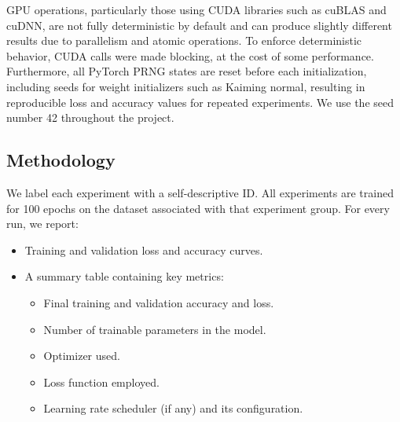 \documentclass[12pt]{article}
\begin{document}
		GPU operations, particularly those using CUDA libraries such as cuBLAS and cuDNN, are not fully deterministic by default and can produce slightly different results due to parallelism and atomic operations. To enforce deterministic behavior, CUDA calls were made blocking, at the cost of some performance. Furthermore, all PyTorch PRNG states are reset before each initialization, including seeds for weight initializers such as Kaiming normal, resulting in reproducible loss and accuracy values for repeated experiments. We use the seed number 42 throughout the project.
		
		\subsection{Methodology}
		We label each experiment with a self-descriptive ID. All experiments are trained for 100 epochs on the dataset associated with that experiment group. For every run, we report:
		
	\begin{itemize}
		\item Training and validation loss and accuracy curves.
		\item A summary table containing key metrics:
		\begin{itemize}
			\item Final training and validation accuracy and loss.
			\item Number of trainable parameters in the model.
			\item Optimizer used.
			\item Loss function employed.
			\item Learning rate scheduler (if any) and its configuration.
		\end{itemize}
	\end{itemize}
	
	
\end{document}
